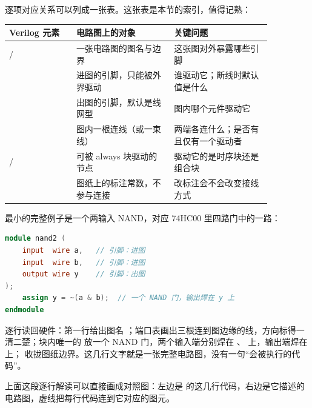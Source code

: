 逐项对应关系可以列成一张表。这张表是本节的索引，值得记熟：

\begin{longtable}{L{0.22\linewidth}L{0.32\linewidth}L{0.32\linewidth}}
\toprule
Verilog 元素 & 电路图上的对象 & 关键问题 \\
\midrule
{}/ & 一张电路图的图名与边界 & 这张图对外暴露哪些引脚 \\\tablerowrule
{} & 进图的引脚，只能被外界驱动 & 谁驱动它；断线时默认值是什么 \\\tablerowrule
{} & 出图的引脚，默认是线网型 & 图内哪个元件驱动它 \\\tablerowrule
{} & 图内一根连线（或一束线） & 两端各连什么；是否有且仅有一个驱动者 \\\tablerowrule
{}/ & 可被 always 块驱动的节点 & 驱动它的是时序块还是组合块 \\\tablerowrule
{} & 图纸上的标注常数，不参与连接 & 改标注会不会改变接线方式 \\
\bottomrule
\end{longtable}

最小的完整例子是一个两输入 NAND，对应 74HC00 里四路门中的一路：

\begin{lstlisting}[language=Verilog]
module nand2 (
    input  wire a,   // 引脚：进图
    input  wire b,   // 引脚：进图
    output wire y    // 引脚：出图
);
    assign y = ~(a & b);  // 一个 NAND 门，输出焊在 y 上
endmodule
\end{lstlisting}

逐行读回硬件：第一行给出图名 ；端口表画出三根连到图边缘的线，方向标得一清二楚；块内唯一的  放一个 NAND 门，两个输入端分别焊在 、 上，输出端焊在  上； 收拢图纸边界。这几行文字就是一张完整电路图，没有一句“会被执行的代码”。

上面这段逐行解读可以直接画成对照图：左边是  的这几行代码，右边是它描述的电路图，虚线把每行代码连到它对应的图元。

